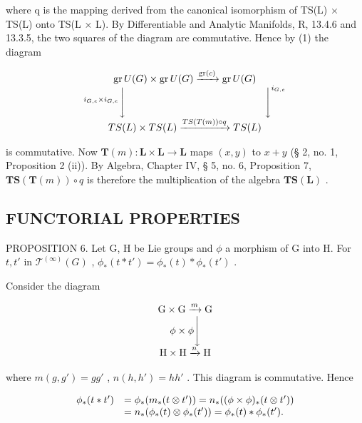 where q is the mapping derived from the canonical isomorphism of TS(L) × TS(L) onto TS(L × L). By Differentiable and Analytic Manifolds, R, 13.4.6 and 13.3.5, the two squares of the diagram are commutative. Hence by (1) the diagram

\[
\begin{array}{c} \operatorname{gr} U (G) \times \operatorname{gr} U (G) \xrightarrow {\operatorname{gr} (c)} \operatorname{gr} U (G) \\ ^ {i _ {G, e} \times i _ {G, e}} \Biggl \downarrow \qquad \qquad \qquad \qquad \qquad \qquad \qquad \Biggl \downarrow^ {i _ {G, e}} \\ T S (L) \times T S (L) \xrightarrow {T S (T (m)) \circ q} T S (L) \end{array}
\]

is commutative. Now \(\mathbf{T}(m): \mathbf{L} \times \mathbf{L} \to \mathbf{L}\) maps \((x, y)\) to \(x + y\) (§ 2, no. 1, Proposition 2 (ii)). By Algebra, Chapter IV, § 5, no. 6, Proposition 7, \(\mathbf{TS}(\mathbf{T}(m)) \circ q\) is therefore the multiplication of the algebra \(\mathbf{TS}(\mathbf{L})\) .

\subsection{FUNCTORIAL PROPERTIES}

PROPOSITION 6. Let G, H be Lie groups and \(\phi\) a morphism of G into H. For \(t, t'\) in \(\mathcal{T}^{(\infty)}(G)\) , \(\phi_{*}(t * t') = \phi_{*}(t) * \phi_{*}(t')\) .

Consider the diagram

\[
\begin{array}{c} \mathrm{G} \times \mathrm{G} \xrightarrow {m} \mathrm{G} \\ \phi \times \phi \Biggl \downarrow \\ \mathrm{H} \times \mathrm{H} \xrightarrow {n} \mathrm{H} \end{array}
\]

where \(m(g, g') = gg'\) , \(n(h, h') = hh'\) . This diagram is commutative. Hence

\[
\begin{array}{r l} \phi_ {*} (t * t ^ {\prime}) & = \phi_ {*} (m _ {*} (t \otimes t ^ {\prime})) = n _ {*} ((\phi \times \phi) _ {*} (t \otimes t ^ {\prime})) \\ & = n _ {*} (\phi_ {*} (t) \otimes \phi_ {*} (t ^ {\prime})) = \phi_ {*} (t) * \phi_ {*} (t ^ {\prime}). \end{array}
\]

